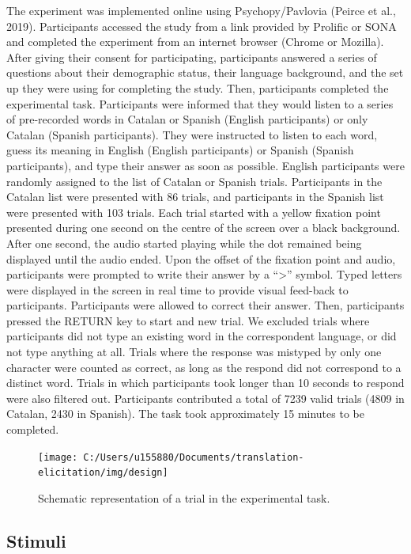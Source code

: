 \documentclass[
  english,
  man,floatsintext]{apa6}
\begin{document}
The experiment was implemented online using Psychopy/Pavlovia (Peirce et al., 2019). Participants accessed the study from a link provided by Prolific or SONA and completed the experiment from an internet browser (Chrome or Mozilla). After giving their consent for participating, participants answered a series of questions about their demographic status, their language background, and the set up they were using for completing the study. Then, participants completed the experimental task. Participants were informed that they would listen to a series of pre-recorded words in Catalan or Spanish (English participants) or only Catalan (Spanish participants). They were instructed to listen to each word, guess its meaning in English (English participants) or Spanish (Spanish participants), and type their answer as soon as possible. English participants were randomly assigned to the list of Catalan or Spanish trials. Participants in the Catalan list were presented with 86 trials, and participants in the Spanish list were presented with 103 trials. Each trial started with a yellow fixation point presented during one second on the centre of the screen over a black background. After one second, the audio started playing while the dot remained being displayed until the audio ended. Upon the offset of the fixation point and audio, participants were prompted to write their answer by a ``\textgreater{}'' symbol. Typed letters were displayed in the screen in real time to provide visual feed-back to participants. Participants were allowed to correct their answer. Then, participants pressed the RETURN key to start and new trial. We excluded trials where participants did not type an existing word in the correspondent language, or did not type anything at all. Trials where the response was mistyped by only one character were counted as correct, as long as the respond did not correspond to a distinct word. Trials in which participants took longer than 10 seconds to respond were also filtered out. Participants contributed a total of 7239 valid trials (4809 in Catalan, 2430 in Spanish). The task took approximately 15 minutes to be completed.

\begin{figure}
\texttt{[image: C:/Users/u155880/Documents/translation-elicitation/img/design]} \caption{Schematic representation of a trial in the experimental task.}\label{fig:procedurefigure}
\end{figure}

\hypertarget{stimuli}{%
\subsection{Stimuli}\label{stimuli}}
\end{document}
